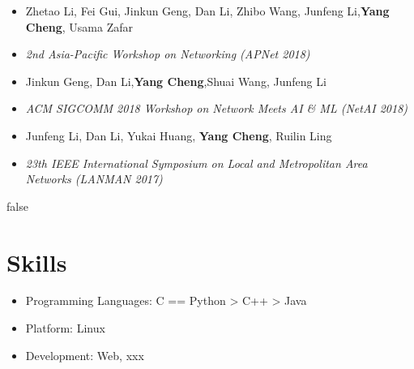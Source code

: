 \documentclass{resume}
\begin{document}
\begin{itemize}
	\item Zhetao Li, Fei Gui, Jinkun Geng, Dan Li, Zhibo Wang, Junfeng Li,\textbf{Yang Cheng}, Usama Zafar
	\item \textit{2nd Asia-Pacific Workshop on Networking (APNet 2018)}
\end{itemize}

\begin{itemize}
	\item Jinkun Geng, Dan Li,\textbf{Yang Cheng},Shuai Wang, Junfeng Li
	\item \textit{ACM SIGCOMM 2018 Workshop on Network Meets AI \& ML (NetAI 2018)}
\end{itemize}

\begin{itemize}
	\item Junfeng Li, Dan Li, Yukai Huang, \textbf{Yang Cheng}, Ruilin Ling
	\item \textit{23th IEEE International Symposium on Local and Metropolitan Area Networks (LANMAN 2017)}
\end{itemize}


\if false
\section{Skills}
\begin{itemize}[parsep=0.5ex]
  \item Programming Languages: C == Python > C++ > Java
  \item Platform: Linux
  \item Development: Web, xxx
\end{itemize}
\fi
\end{document}
